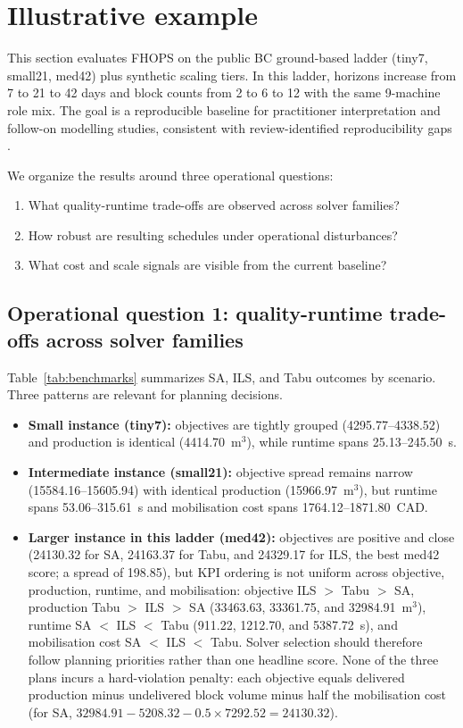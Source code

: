 \section{Illustrative example}
\label{sec:illustrative-example}

This section evaluates FHOPS on the public BC ground-based ladder (tiny7, small21, med42) plus synthetic scaling tiers. In this ladder, horizons increase from 7 to 21 to 42 days and block counts from 2 to 6 to 12 with the same 9-machine role mix. The goal is a reproducible baseline for practitioner interpretation and follow-on modelling studies, consistent with review-identified reproducibility gaps \cite{jaffray2026systematic}.

We organize the results around three operational questions:
\begin{enumerate}
  \item What quality-runtime trade-offs are observed across solver families?
  \item How robust are resulting schedules under operational disturbances?
  \item What cost and scale signals are visible from the current baseline?
\end{enumerate}

\subsection{Operational question 1: quality-runtime trade-offs across solver families}
Table~\ref{tab:benchmarks} summarizes SA, ILS, and Tabu outcomes by scenario. Three patterns are relevant for planning decisions.
\begin{itemize}
  \item \textbf{Small instance (tiny7):} objectives are tightly grouped (4295.77--4338.52) and production is identical (4414.70~m$^3$), while runtime spans 25.13--245.50~s.
  \item \textbf{Intermediate instance (small21):} objective spread remains narrow (15584.16--15605.94) with identical production (15966.97~m$^3$), but runtime spans 53.06--315.61~s and mobilisation cost spans 1764.12--1871.80~CAD.
  \item \textbf{Larger instance in this ladder (med42):} objectives are positive and close (24130.32 for SA, 24163.37 for Tabu, and 24329.17 for ILS, the best med42 score; a spread of 198.85), but KPI ordering is not uniform across objective, production, runtime, and mobilisation: objective ILS $>$ Tabu $>$ SA, production Tabu $>$ ILS $>$ SA (33463.63, 33361.75, and 32984.91~m$^3$), runtime SA $<$ ILS $<$ Tabu (911.22, 1212.70, and 5387.72~s), and mobilisation cost SA $<$ ILS $<$ Tabu. Solver selection should therefore follow planning priorities rather than one headline score. None of the three plans incurs a hard-violation penalty: each objective equals delivered production minus undelivered block volume minus half the mobilisation cost (for SA, $32984.91-5208.32-0.5\times7292.52=24130.32$).
\end{itemize}

